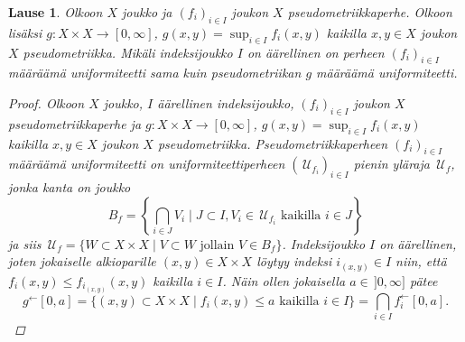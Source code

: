 \documentclass[12pt,a4paper,leqno]{report}
\newcommand{\U}{\,\mathcal{U}}
\newcommand{\Pot}{\mathcal{P}}
\theoremstyle{plain}
\newtheorem{lause}[equation]{Lause}
\theoremstyle{definition}
\theoremstyle{remark}
\begin{document}
\begin{lause}
%
%
Olkoon $X$ joukko ja 
$(f_i)_{i\in I} $ joukon $X$ pseudometriikkaperhe. 
Olkoon lisäksi $g\colon X\times X\rightarrow [0,\infty]$, 
$g(x,y)=\sup_{i\in I} f_i(x,y)$ kaikilla $x,y\in X$ 
joukon $X$ pseudometriikka. 
Mikäli indeksijoukko $I$ on äärellinen on perheen $(f_i)_{i\in I}$ määräämä 
uniformiteetti sama kuin pseudometriikan $g$ määräämä uniformiteetti.
\begin{proof}
Olkoon $X$ joukko, $I$ äärellinen indeksijoukko, 
$(f_i)_{i\in I} $ joukon $X$ pseudometriikkaperhe ja 
$g\colon X\times X\rightarrow [0,\infty]$, 
$g(x,y)=\sup_{i\in I} f_i(x,y)$ kaikilla $x,y\in X$ 
joukon $X$ pseudometriikka. 
Pseudometriikkaperheen $(f_i)_{i\in I} $ määräämä uniformiteetti on 
uniformiteettiperheen $(\U_{f_i})_{i\in I} $ pienin yläraja $\U_f$, 
jonka kanta on joukko 
$$B_f=\left\{\bigcap_{i\in J}V_i\mid J\subset I, V_i\in \U_{f_i} \text{ kaikilla }i\in J\right\}$$
ja siis 
$\U_f=\{W\subset X\times X\mid V\subset W\text{ jollain }V\in B_f\}$.
%
Indeksijoukko $I$ on äärellinen, 
joten jokaiselle alkioparille $(x,y)\in X\times X$ löytyy indeksi $i_{(x,y)}\in I$ niin, 
että $f_i(x,y)\leq f_{i_{(x,y)}}(x,y)$ kaikilla $i\in I$.
Näin ollen jokaisella $a\in \,]0,\infty]$ pätee  
$$g^\leftarrow[0,a]=\{(x,y)\subset X\times X\mid 
f_i(x,y)\leq a \text{ kaikilla } i\in I
\}=\bigcap_{i\in I} f_i^\leftarrow[0,a].$$

\end{proof}
\end{lause}
\end{document}
